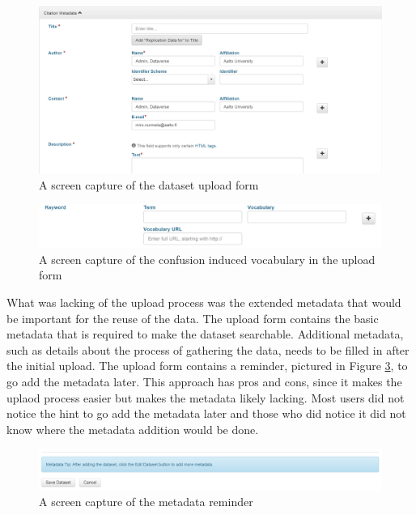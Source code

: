 \begin{figure}
    \begin{centering}
        \includegraphics[width=\textwidth]{images/upload}
    \end{centering}
    \caption{A screen capture of the dataset upload form}
    \label{fig:upload}
\end{figure}

\begin{figure}
    \begin{centering}
        \includegraphics[width=\textwidth]{images/vocabulary}
    \end{centering}
    \caption{A screen capture of the confusion induced vocabulary in the upload form}
    \label{fig:vocabulary}
\end{figure}

What was lacking of the upload process was the extended metadata that would be
important for the reuse of the data. The upload form contains the basic
metadata that is required to make the dataset searchable. Additional metadata,
such as details about the process of gathering the data, needs to be filled in
after the initial upload. The upload form contains a reminder, pictured in
Figure \ref{fig:hint}, to go add the metadata later. This approach has pros and
cons, since it makes the uplaod process easier but makes the metadata likely
lacking. Most users did not notice the hint to go add the metadata later and
those who did notice it did not know where the metadata addition would be done.

\begin{figure}
    \begin{centering}
        \includegraphics[width=\textwidth]{images/hint}
    \end{centering}
    \caption{A screen capture of the metadata reminder}
    \label{fig:hint}
\end{figure}

